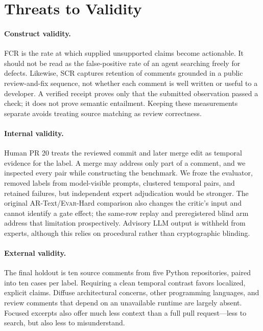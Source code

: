 \documentclass[acmsmall,screen,review,anonymous]{acmart}
\newcommand{\evar}{\textsc{Evar}\xspace}
\begin{document}
\section{Threats to Validity}

\paragraph{Construct validity.}
FCR is the rate at which supplied unsupported claims become actionable. It should not be read as the false-positive rate of an agent searching freely for defects. Likewise, SCR captures retention of comments grounded in a public review-and-fix sequence, not whether each comment is well written or useful to a developer. A verified receipt proves only that the submitted observation passed a check; it does not prove semantic entailment. Keeping these measurements separate avoids treating source matching as review correctness.

\paragraph{Internal validity.}
Human PR 20 treats the reviewed commit and later merge edit as temporal evidence for the label. A merge may address only part of a comment, and we inspected every pair while constructing the benchmark. We froze the evaluator, removed labels from model-visible prompts, clustered temporal pairs, and retained failures, but independent expert adjudication would be stronger. The original AR-Text/\evar-Hard comparison also changes the critic's input and cannot identify a gate effect; the same-row replay and preregistered blind arm address that limitation prospectively. Advisory LLM output is withheld from experts, although this relies on procedural rather than cryptographic blinding.

\paragraph{External validity.}
The final holdout is ten source comments from five Python repositories, paired into ten cases per label. Requiring a clean temporal contrast favors localized, explicit claims. Diffuse architectural concerns, other programming languages, and review comments that depend on an unavailable runtime are largely absent. Focused excerpts also offer much less context than a full pull request---less to search, but also less to misunderstand.
\end{document}
